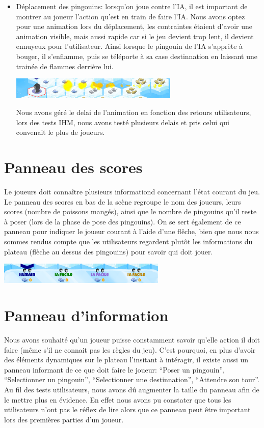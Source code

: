 \documentclass{report}
\begin{document}
\begin{itemize}
\item Déplacement des pingouins: lorsqu'on joue contre l'IA, il est important de montrer au joueur l'action qu'est en train de faire l'IA. Nous avons optez pour une animation lors du déplacement, les contraintes étaient d'avoir une animation visible, mais aussi rapide car si le jeu devient trop lent, il devient ennuyeux pour l'utilisateur. Ainsi lorsque le pingouin de l'IA s'apprète à bouger, il s'enflamme, puis se téléporte à sa case destinnation en laissant une trainée de flammes derrière lui.
  \begin{center}
    \includegraphics[width=8cm]{image/pingouin_deplacement.png}    
  \end{center}
  Nous avons géré le delai de l'animation en fonction des retours utilisateurs, lors des tests IHM, nous avons testé plusieurs delais et pris celui qui convenait le plus de joueurs.
\end{itemize}

\section{Panneau des scores}
Le joueurs doit connaître plusieurs informationd concernant l'état courant du jeu. Le panneau des scores en bas de la scène regroupe le nom des joueurs, leurs scores (nombre de poissons mangés), ainsi que le nombre de pingouins qu'il reste à poser (lors de la phase de pose des pingouins). On se sert également de ce panneau pour indiquer le joueur courant à l'aide d'une flêche, bien que nous nous sommes rendus compte que les utilisateurs regardent plutôt les informations du plateau (flèche au dessus des pingouins) pour savoir qui doit jouer.
  \begin{center}
    \includegraphics[width=8cm]{image/tableau_scores.png}    
  \end{center}

\section{Panneau d'information}
Nous avons souhaité qu'un joueur puisse constamment savoir qu'elle action il doit faire (même s'il ne connait pas les règles du jeu). C'est pourquoi, en plus d'avoir des éléments dynamiques sur le plateau l'insitant à intéragir, il existe aussi un panneau informant de ce que doit faire le joueur: ``Poser un pingouin'', ``Selectionner un pingouin'', ``Selectionner une destinnation'', ``Attendre son tour''. Au fil des tests utilisateurs, nous avons dû augmenter la taille du panneau afin de le mettre plus en évidence. En effet nous avons pu constater que tous les utilisateurs n'ont pas le réflex de lire alors que ce panneau peut être important lors des premières parties d'un joueur.
\end{document}
